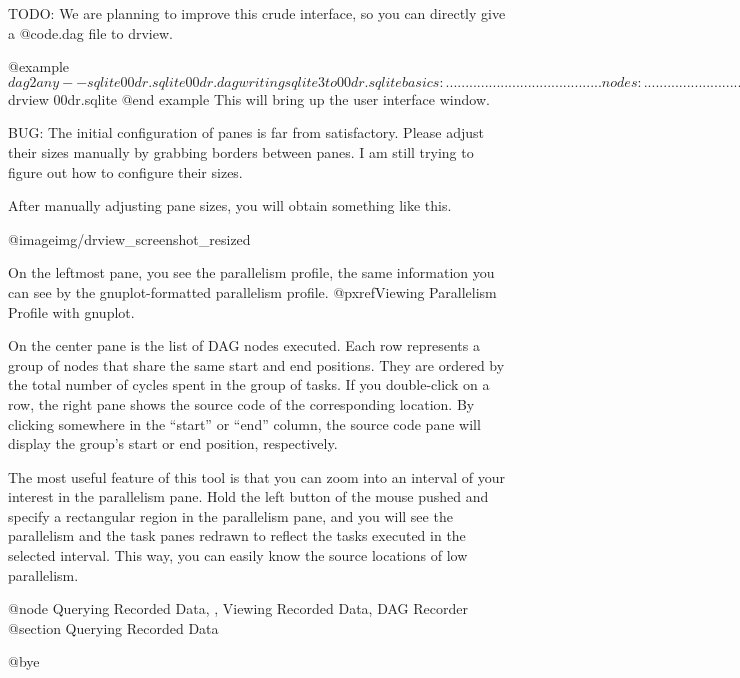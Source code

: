 TODO: We are planning to improve this crude interface, so you can
directly give a @code{.dag} file to drview.

@example
$ dag2any --sqlite 00dr.sqlite 00dr.dag 
writing sqlite3 to 00dr.sqlite
basics:  ........................................
nodes:   ........................................
edges:   ........................................
strings: ........................................
committing
$ drview 00dr.sqlite
@end example
This will bring up the user interface window.

BUG: The initial configuration of panes is far from satisfactory.
Please adjust their sizes manually by grabbing borders between panes.  I
am still trying to figure out how to configure their sizes.

After manually adjusting pane sizes, you will obtain something like this.

@image{img/drview_screenshot_resized}

On the leftmost pane, you see the parallelism profile, the same
information you can see by the gnuplot-formatted parallelism profile.
@pxref{Viewing Parallelism Profile with gnuplot}. 

On the center pane is the list of DAG nodes executed.  Each row
represents a group of nodes that share the same start and end positions.
They are ordered by the total number of cycles spent in the group of
tasks.  If you double-click on a row, the right pane shows the source
code of the corresponding location.  By clicking somewhere in the
``start'' or ``end'' column, the source code pane will display the
group's start or end position, respectively.

The most useful feature of this tool is that you can zoom into an
interval of your interest in the parallelism pane.  Hold the left button
of the mouse pushed and specify a rectangular region in the parallelism
pane, and you will see the parallelism and the task panes redrawn to
reflect the tasks executed in the selected interval.  This way, you can
easily know the source locations of low parallelism.

@node Querying Recorded Data,  , Viewing Recorded Data, DAG Recorder
@section Querying Recorded Data


@bye
                                   

